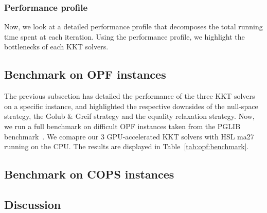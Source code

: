 \subsubsection{Performance profile}
Now, we look at a detailed performance profile that decomposes
the total running time spent at each iteration. Using the performance
profile, we highlight the bottlenecks of each KKT solvers.



\subsection{Benchmark on OPF instances}
The previous subsection has detailed the performance of the
three KKT solvers on a specific instance, and highlighted
the respective downsides of the null-space strategy,
the Golub \& Greif strategy and the equality relaxation strategy.
Now, we run a full benchmark on difficult OPF instances taken
from the PGLIB benchmark~\cite{babaeinejadsarookolaee2019power}.
We comapre our 3 GPU-accelerated KKT solvers with HSL ma27 running
on the CPU.
The results are displayed in Table~\ref{tab:opf:benchmark}.

\begin{table}[!ht]
  \centering
  \caption{OPF benchmark \label{tab:opf:benchmark}}
\end{table}



\subsection{Benchmark on COPS instances}

\subsection{Discussion}

